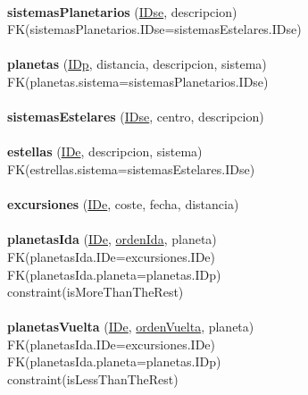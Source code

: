 \documentclass[a4paper,10pt]{article}
\newcommand\tab[1][1cm]{\hspace*{#1}}
\begin{document}
\paragraph{}
{\bf sistemasPlanetarios} (\underline{IDse}, descripcion)\\
\tab FK(sistemasPlanetarios.IDse=sistemasEstelares.IDse)

\paragraph{}
{\bf planetas} (\underline{IDp}, distancia, descripcion, sistema)\\
\tab FK(planetas.sistema=sistemasPlanetarios.IDse)

\paragraph{}
{\bf sistemasEstelares} (\underline{IDse}, centro, descripcion)

\paragraph{}
{\bf estellas} (\underline{IDe}, descripcion, sistema)\\
\tab FK(estrellas.sistema=sistemasEstelares.IDse)

\paragraph{}
{\bf excursiones} (\underline{IDe}, coste, fecha, distancia)

\paragraph{}
{\bf planetasIda} (\underline{IDe}, \underline{ordenIda}, planeta)\\
\tab FK(planetasIda.IDe=excursiones.IDe)\\
\tab FK(planetasIda.planeta=planetas.IDp)\\
\tab constraint(isMoreThanTheRest)

\paragraph{}
{\bf planetasVuelta} (\underline{IDe}, \underline{ordenVuelta}, planeta)\\
\tab FK(planetasIda.IDe=excursiones.IDe)\\
\tab FK(planetasIda.planeta=planetas.IDp)\\
\tab constraint(isLessThanTheRest)
\end{document}

